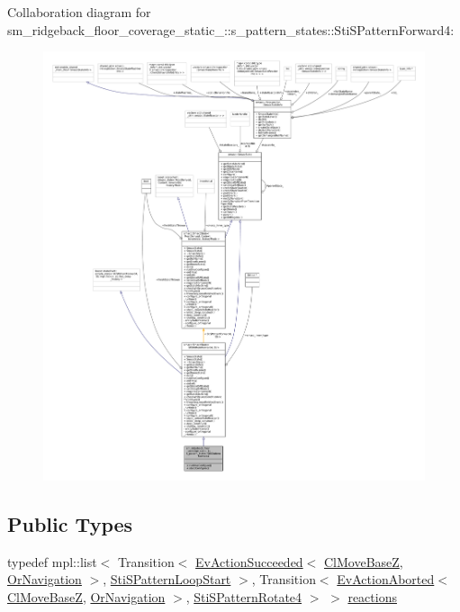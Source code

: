 Collaboration diagram for sm\+\_\+ridgeback\+\_\+floor\+\_\+coverage\+\_\+static\+\_\+:\+:s\+\_\+pattern\+\_\+states\+:\+:Sti\+S\+Pattern\+Forward4\+:
\nopagebreak
\begin{figure}[H]
\begin{center}
\leavevmode
\includegraphics[width=350pt]{structsm__ridgeback__floor__coverage__static__1_1_1s__pattern__states_1_1StiSPatternForward4__coll__graph}
\end{center}
\end{figure}
\subsection*{Public Types}
\begin{DoxyCompactItemize}
\item 
typedef mpl\+::list$<$ Transition$<$ \hyperlink{structsmacc_1_1default__events_1_1EvActionSucceeded}{Ev\+Action\+Succeeded}$<$ \hyperlink{classcl__move__base__z_1_1ClMoveBaseZ}{Cl\+Move\+BaseZ}, \hyperlink{classsm__ridgeback__floor__coverage__static__1_1_1OrNavigation}{Or\+Navigation} $>$, \hyperlink{structsm__ridgeback__floor__coverage__static__1_1_1s__pattern__states_1_1StiSPatternLoopStart}{Sti\+S\+Pattern\+Loop\+Start} $>$, Transition$<$ \hyperlink{structsmacc_1_1default__events_1_1EvActionAborted}{Ev\+Action\+Aborted}$<$ \hyperlink{classcl__move__base__z_1_1ClMoveBaseZ}{Cl\+Move\+BaseZ}, \hyperlink{classsm__ridgeback__floor__coverage__static__1_1_1OrNavigation}{Or\+Navigation} $>$, \hyperlink{structsm__ridgeback__floor__coverage__static__1_1_1s__pattern__states_1_1StiSPatternRotate4}{Sti\+S\+Pattern\+Rotate4} $>$ $>$ \hyperlink{structsm__ridgeback__floor__coverage__static__1_1_1s__pattern__states_1_1StiSPatternForward4_a0646b9fcd87d4af839c1773a86c5aa00}{reactions}
\end{DoxyCompactItemize}
